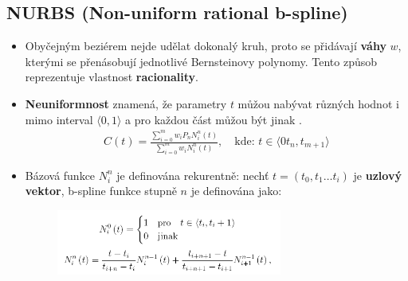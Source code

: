 \subsection{NURBS (Non-uniform rational b-spline)}
\begin{itemize}
	\item Obyčejným beziérem nejde udělat dokonalý kruh, proto se přidávají \textbf{váhy} $w$, kterými se přenásobují jednotlivé Bernsteinovy polynomy. Tento způsob reprezentuje vlastnost \textbf{racionality}.
	\item \textbf{Neuniformnost} znamená, že parametry $t$ můžou nabývat různých hodnot i mimo interval $\langle0,1\rangle$ a pro každou část můžou být jinak .
			\begin{equation*} 
		\begin{array}{c}
			C(t) = \frac{\sum\limits_{i=0}^m w_i P_n N_i^n (t) }{\sum\limits_{i=0}^m w_i N_i^n (t)}, \quad \textrm{kde: } t \in \langle0t_n, t_{m+1}\rangle
		\end{array}		
		\end{equation*}
	\item Bázová funkce $N_i^n$ je definována rekurentně: nechť $t = (t_0, t_1 \ldots t_i)$ je \textbf{uzlový vektor}, b-spline funkce stupně $n$ je definována jako:
		\begin{figure}[H]
		\centering
		\includegraphics[width=0.7\textwidth]{assets/3_nurbs}
		\end{figure}
\end{itemize}
